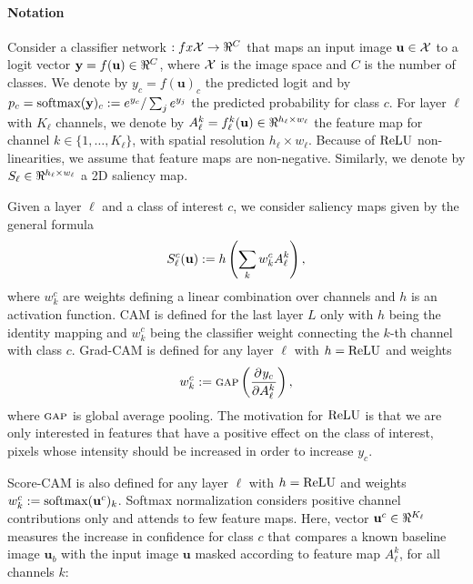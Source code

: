 \paragraph{Notation}
\label{sec:oc_notation}
Consider a classifier network $:fx \cX \to \real^C$ that maps an input image $\mathbf{u} \in \mathcal{X}$ to a 
logit vector $\vy = f(\mathbf{u}) \in \real^C$, where $\mathcal{X}$ is the image space and $C$ is the number 
of classes. We denote by $y_c = f(\mathbf{u})_c$ the predicted logit and by $p_c = \operatorname{softmax}(\mathbf{y})_c 
\mathrel{:=} e^{y_c} / \sum_j e^{y_j}$ the predicted probability for class $c$. For layer $\ell$ 
with $K_\ell$ channels, we denote by $A^k_\ell = f^k_\ell(\mathbf{u}) \in \real^{h_\ell \times w_\ell}$ 
the feature map for channel $k \in \{1,\dots,K_\ell\}$, with spatial resolution $h_\ell \times 
w_\ell$. Because of ${\operatorname{ReLU}}$ non-linearities, we assume that feature maps are non-negative. 
Similarly, we denote by $S_\ell \in \real^{h_\ell \times w_\ell}$ a 2D saliency map.




\label{sec:oc_back}

Given a layer $\ell$ and a class of interest $c$, we consider saliency maps given by the general 
formula
\begin{equation}
	S^c_\ell(\mathbf{u}) \mathrel{:=} h \left( \sum_k w^c_k A^k_\ell \right),
\label{eq:sal}
\end{equation}
where $w^c_k$ are weights defining a linear combination over channels and $h$ is an activation 
function. CAM \parencite{zhou2016learning} is defined for the last layer $L$ only with $h$ being the 
identity mapping and $w^c_k$ being the classifier weight connecting the $k$-th channel with 
class $c$. Grad-CAM \parencite{selvaraju2017grad} is defined for any layer $\ell$ with $h = {\operatorname{ReLU}}$ and 
weights
\begin{equation}
	w^c_k \mathrel{:=} {\textsc{gap}} \left( \frac{\partial^{}{y_c}}{\partial{{A^k_\ell}^{}}} \right),
\label{eq:gcam}
\end{equation}
where ${\textsc{gap}}$ is global average pooling.
The motivation for ${\operatorname{ReLU}}$ is that we are only interested in features that have a positive effect 
on the class of interest, \ie pixels whose intensity should be increased in order to increase $y_c$.

Score-CAM \parencite{wang2020score} is also defined for any layer $\ell$ with $h = {\operatorname{ReLU}}$ and weights 
$w^c_k \mathrel{:=} \operatorname{softmax}(\mathbf{u}^c)_k$.  Softmax normalization considers positive channel contributions 
only and attends to few feature maps.
Here, vector $\mathbf{u}^c \in \real^{K_\ell}$ measures the increase in confidence for class $c$ that 
compares a known baseline image $\mathbf{u}_b$ with the input image $\mathbf{u}$ masked according to feature 
map $A^k_\ell$, for all channels $k$:

